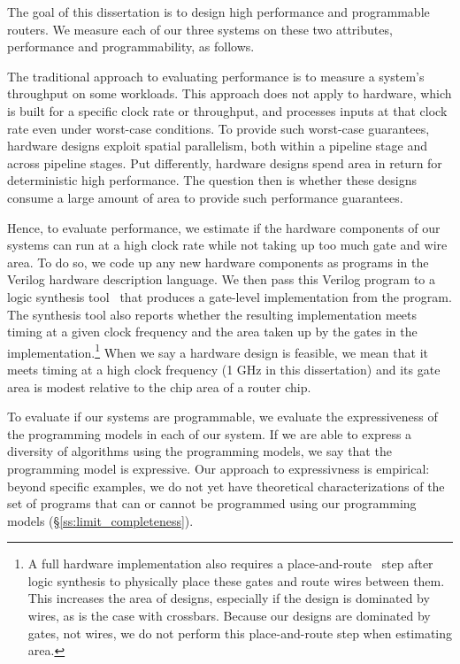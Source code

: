The goal of this dissertation is to design high performance and programmable
routers. We measure each of our three systems on these two attributes,
performance and programmability, as follows.

The traditional approach to evaluating performance is to measure a system's
throughput on some workloads. This approach does not apply to hardware, which is
built for a specific clock rate or throughput, and processes inputs at that
clock rate even under worst-case conditions. To provide such worst-case
guarantees, hardware designs exploit spatial parallelism, both within a
pipeline stage and across pipeline stages.  Put differently, hardware designs
spend area in return for deterministic  high performance. The question then is
whether these designs consume a large amount of area to provide such
performance guarantees.
 
Hence, to evaluate performance, we estimate if the hardware components of our
systems can run at a high clock rate while not taking up too much gate and wire
area. To do so, we code up any new hardware components as programs in the
Verilog hardware description language.  We then pass this Verilog program to a
logic synthesis tool~\cite{synopsys_dc, cadence_rc} that produces a gate-level
implementation from the program.  The synthesis tool also reports whether the
resulting implementation meets timing at a given clock frequency and the area
taken up by the gates in the implementation.\footnote{A full hardware
implementation also requires a place-and-route~\cite{par} step after logic
synthesis to physically place these gates and route wires between them. This
increases the area of designs, especially if the design is dominated by wires,
as is the case with crossbars. Because our designs are dominated by gates, not
wires, we do not perform this place-and-route step when estimating area.} When
we say a hardware design is feasible, we mean that it meets timing at a high
clock frequency (1 GHz in this dissertation) and its gate area is modest
relative to the chip area of a router chip.

To evaluate if our systems are programmable, we evaluate the expressiveness of
the programming models in each of our system. If we are able to express a
diversity of algorithms using the programming models, we say that the
programming model is expressive. Our approach to expressivness is empirical:
beyond specific examples, we do not yet have theoretical characterizations of
the set of programs that can or cannot be programmed using our programming
models (\S\ref{ss:limit_completeness}).

